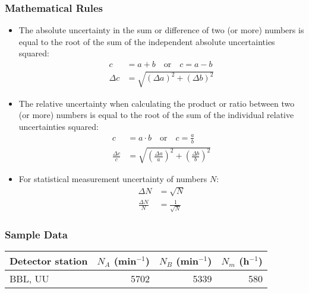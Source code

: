 \begin{shaded}
\subsubsection*{Mathematical Rules}
\begin{itemize}
\item The absolute uncertainty in the sum or difference of two (or more) numbers is equal to the root of the sum of the independent absolute uncertainties squared:
\begin{align*}
c &= a + b \quad \text{or} \quad c = a - b \\
\Delta c &= \sqrt{(\Delta a)^2 + (\Delta b)^2}
\end{align*}
\item The relative uncertainty when calculating the product or ratio between two (or more) numbers is equal to the root of the sum of the individual relative uncertainties squared:
\begin{align*}
c &= a \cdot b \quad \text{or} \quad c = \frac{a}{b} \\
\frac{\Delta c}{c} &= \sqrt{\left( \frac{\Delta a}{a}\right) ^2 + \left( \frac{\Delta b}{b}\right) ^2}
\end{align*}
\item For statistical measurement uncertainty of numbers $N$:
\begin{align*}
\Delta N &= \sqrt{N} \\
\frac{\Delta N}{N} &= \frac{1}{\sqrt{N}}
\end{align*}
\end{itemize}
\end{shaded}

\begin{shaded}
\subsubsection*{Sample Data}

\begin{tabular}[h] {l r r r}
Detector station & $N_A$ (min$^{-1}$) & $N_B$ (min$^{-1}$) & $N_m$ (h$^{-1}$) \\ \hline
BBL, UU & 5702 & 5339 & 580\\
\end{tabular}
\label{tab:data_1}
\end{shaded}




